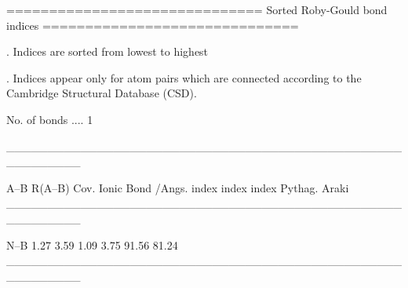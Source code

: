 
==============================
Sorted Roby-Gould bond indices
==============================

. Indices are sorted from lowest to highest

. Indices appear only for atom pairs which are connected
  according to the Cambridge Structural Database (CSD).

No. of bonds .... 1

_________________________________________________________

  A--B    R(A--B)    Cov.   Ionic   Bond    %
           /Angs.   index   index  index  Pythag.   Araki
_________________________________________________________

  N--B       1.27    3.59    1.09   3.75    91.56   81.24
_________________________________________________________
